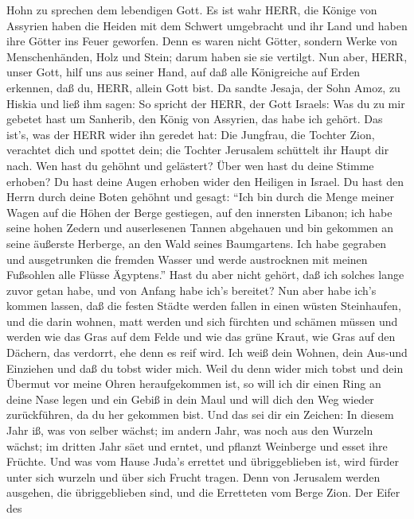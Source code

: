 Hohn zu sprechen dem lebendigen Gott.  Es ist wahr HERR,
die Könige von Assyrien haben die Heiden mit dem Schwert umgebracht und
ihr Land  und haben ihre Götter ins Feuer geworfen. Denn es
waren nicht Götter, sondern Werke von Menschenhänden, Holz und Stein;
darum haben sie sie vertilgt.  Nun aber, HERR, unser Gott,
hilf uns aus seiner Hand, auf daß alle Königreiche auf Erden erkennen,
daß du, HERR, allein Gott bist.  Da sandte Jesaja, der Sohn
Amoz, zu Hiskia und ließ ihm sagen: So spricht der HERR, der Gott
Israels: Was du zu mir gebetet hast um Sanherib, den König von Assyrien,
das habe ich gehört.  Das ist's, was der HERR wider ihn
geredet hat: Die Jungfrau, die Tochter Zion, verachtet dich und spottet
dein; die Tochter Jerusalem schüttelt ihr Haupt dir nach. 
Wen hast du gehöhnt und gelästert? Über wen hast du deine Stimme
erhoben? Du hast deine Augen erhoben wider den Heiligen in Israel.
 Du hast den Herrn durch deine Boten gehöhnt und gesagt:
``Ich bin durch die Menge meiner Wagen auf die Höhen der Berge
gestiegen, auf den innersten Libanon; ich habe seine hohen Zedern und
auserlesenen Tannen abgehauen und bin gekommen an seine äußerste
Herberge, an den Wald seines Baumgartens.  Ich habe
gegraben und ausgetrunken die fremden Wasser und werde austrocknen mit
meinen Fußsohlen alle Flüsse Ägyptens.''  Hast du aber
nicht gehört, daß ich solches lange zuvor getan habe, und von Anfang
habe ich's bereitet? Nun aber habe ich's kommen lassen, daß die festen
Städte werden fallen in einen wüsten Steinhaufen,  und die
darin wohnen, matt werden und sich fürchten und schämen müssen und
werden wie das Gras auf dem Felde und wie das grüne Kraut, wie Gras auf
den Dächern, das verdorrt, ehe denn es reif wird.  Ich weiß
dein Wohnen, dein Aus-und Einziehen und daß du tobst wider mich.
 Weil du denn wider mich tobst und dein Übermut vor meine
Ohren heraufgekommen ist, so will ich dir einen Ring an deine Nase legen
und ein Gebiß in dein Maul und will dich den Weg wieder zurückführen, da
du her gekommen bist.  Und das sei dir ein Zeichen: In
diesem Jahr iß, was von selber wächst; im andern Jahr, was noch aus den
Wurzeln wächst; im dritten Jahr säet und erntet, und pflanzt Weinberge
und esset ihre Früchte.  Und was vom Hause Juda's errettet
und übriggeblieben ist, wird fürder unter sich wurzeln und über sich
Frucht tragen.  Denn von Jerusalem werden ausgehen, die
übriggeblieben sind, und die Erretteten vom Berge Zion. Der Eifer des
